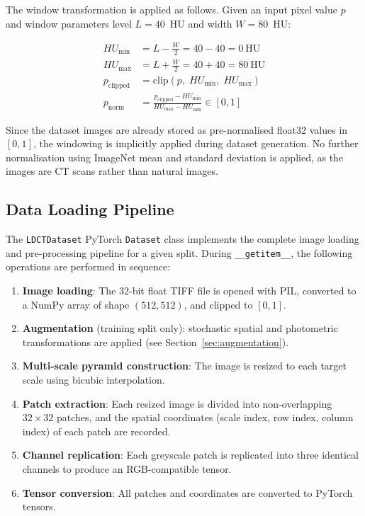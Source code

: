 The window transformation is applied as follows. Given an input pixel value $p$ and
window parameters level $L = 40$~HU and width $W = 80$~HU:

\begin{align}
    HU_{\min} &= L - \frac{W}{2} = 40 - 40 = 0~\text{HU} \\
    HU_{\max} &= L + \frac{W}{2} = 40 + 40 = 80~\text{HU} \\
    p_{\text{clipped}} &= \text{clip}(p,\; HU_{\min},\; HU_{\max}) \\
    p_{\text{norm}} &= \frac{p_{\text{clipped}} - HU_{\min}}{HU_{\max} - HU_{\min}} \in [0, 1]
\end{align}

Since the dataset images are already stored as pre-normalised float32 values in $[0,1]$,
the windowing is implicitly applied during dataset generation. No further normalisation
using ImageNet mean and standard deviation is applied, as the images are CT scans rather
than natural images.

\subsection{Data Loading Pipeline}

The \texttt{LDCTDataset} PyTorch \texttt{Dataset} class implements the complete image
loading and pre-processing pipeline for a given split. During \texttt{\_\_getitem\_\_},
the following operations are performed in sequence:

\begin{enumerate}
    \item \textbf{Image loading}: The 32-bit float TIFF file is opened with PIL,
          converted to a NumPy array of shape $(512, 512)$, and clipped to $[0, 1]$.
    \item \textbf{Augmentation} (training split only): stochastic spatial and
          photometric transformations are applied (see Section~\ref{sec:augmentation}).
    \item \textbf{Multi-scale pyramid construction}: The image is resized to each
          target scale using bicubic interpolation.
    \item \textbf{Patch extraction}: Each resized image is divided into
          non-overlapping $32 \times 32$ patches, and the spatial coordinates
          (scale index, row index, column index) of each patch are recorded.
    \item \textbf{Channel replication}: Each greyscale patch is replicated into
          three identical channels to produce an RGB-compatible tensor.
    \item \textbf{Tensor conversion}: All patches and coordinates are converted to
          PyTorch tensors.
\end{enumerate}

